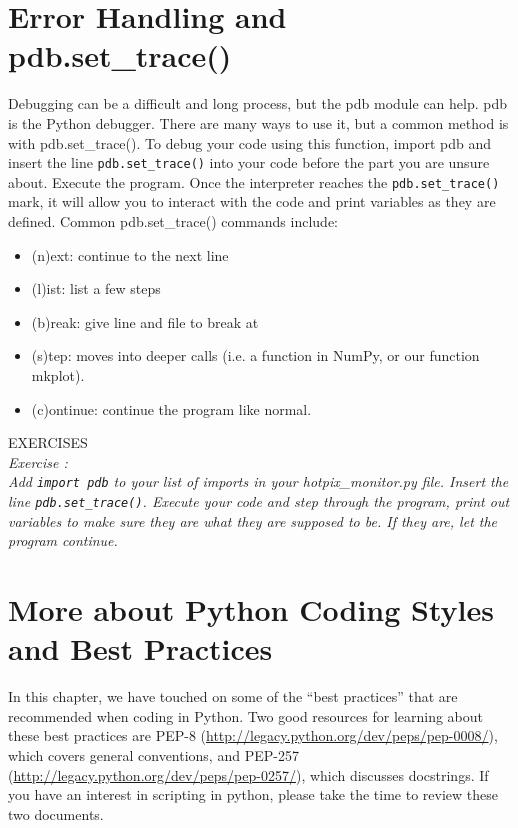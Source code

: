 \section{Error Handling and {\sf pdb.set\_trace()}}
Debugging can be a difficult and long process, but the {\sf\small pdb}
module can help.  {\sf\small pdb} is the Python debugger.  There are
many ways to use it, but a common method is with {\sf\small
  pdb.set\_trace()}.  To debug your code using this function, import
{\sf\small pdb} and insert the line \texttt{pdb.set\_trace()} into your
code before the part you are unsure about.  Execute the program.  Once
the interpreter reaches the \texttt{pdb.set\_trace()} mark, it will
allow you to interact with the code and print variables as they are
defined.   Common {\sf\small pdb.set\_trace()} commands include:
\begin{itemize}
\item (n)ext:    continue to the next line
\item (l)ist:      list a few steps
\item (b)reak:  give line and file to break at
\item (s)tep:    moves into deeper calls (i.e. a function in NumPy, or
  our function {\sf\small mkplot}).
\item (c)ontinue: continue the program like normal.
\end{itemize}

{\color{blue} {\sf\small EXERCISES}} \\
{\it Exercise  :  \\
  Add \texttt{import pdb} to your list of imports in your
  {\sf\small hotpix\_monitor.py file}.  Insert the line \texttt{pdb.set\_trace()}.
  Execute your code and step through the program, print out variables
  to make sure they are what they are supposed to be.  If they are, 
  let the program continue. }

\section{More about Python Coding Styles and Best Practices}
In this chapter, we have touched on some of the ``best practices'' that are
recommended when coding in Python.  Two good resources for learning about
these best practices are PEP-8 (\url {http://legacy.python.org/dev/peps/pep-0008/}),
which covers general conventions, and PEP-257 (\url {http://legacy.python.org/dev/peps/pep-0257/}),
which discusses docstrings.  If you have an interest in scripting in python, please take the time
to review these two documents.